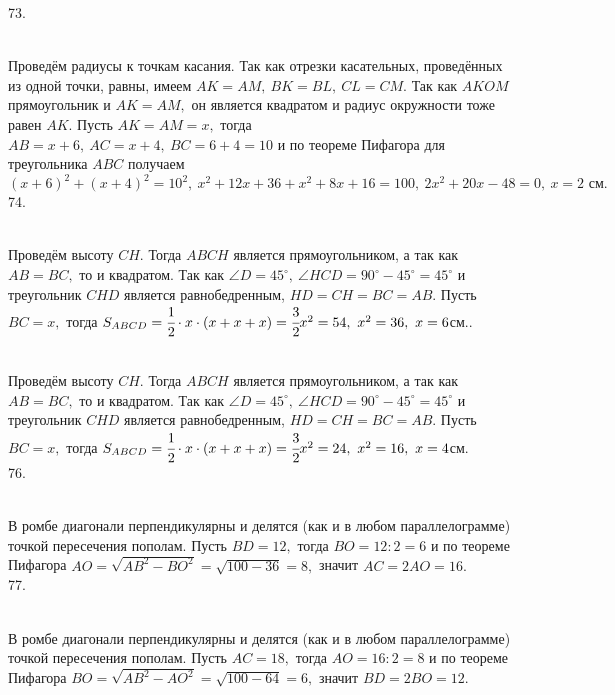 73. \begin{figure}[ht!]
\end{figure}\\
Проведём радиусы к точкам касания. Так как отрезки касательных, проведённых из одной точки, равны, имеем $AK=AM,\ BK=BL,\ CL=CM.$ Так как $AKOM$ прямоугольник и $AK=AM,$ он является квадратом и радиус окружности тоже равен $AK.$ Пусть $AK=AM=x,$ тогда $AB=x+6,\ AC=x+4,\ BC=6+4=10$ и по теореме Пифагора для треугольника $ABC$ получаем $(x+6)^2+(x+4)^2=10^2,\ x^2+12x+36+x^2+8x+16=100,\ 2x^2+20x-48=0,\ x=2\text{ см}.$\\
74. \begin{figure}[ht!]
\end{figure}\\
Проведём высоту $CH.$ Тогда $ABCH$ является прямоугольником, а так как $AB=BC,$ то и квадратом. Так как $\angle D=45^\circ,\ \angle HCD=90^\circ-45^\circ=45^\circ$ и треугольник $CHD$ является равнобедренным, $HD=CH=BC=AB.$ Пусть $BC=x,$ тогда $S_{ABCD}=\cfrac{1}{2}\cdot{x}\cdot(x+x+x)=\cfrac{3}{2}x^2=54,\ x^2=36,\ x=6$см.\newpage{}. \begin{figure}[ht!]
\end{figure}\\
Проведём высоту $CH.$ Тогда $ABCH$ является прямоугольником, а так как $AB=BC,$ то и квадратом. Так как $\angle D=45^\circ,\ \angle HCD=90^\circ-45^\circ=45^\circ$ и треугольник $CHD$ является равнобедренным, $HD=CH=BC=AB.$ Пусть $BC=x,$ тогда $S_{ABCD}=\cfrac{1}{2}\cdot{x}\cdot(x+x+x)=\cfrac{3}{2}x^2=24,\ x^2=16,\ x=4$см.\\
76. \begin{figure}[ht!]
\end{figure}\\
В ромбе диагонали перпендикулярны и делятся (как и в любом параллелограмме) точкой пересечения пополам. Пусть $BD=12,$ тогда $BO=12:2=6$ и по теореме Пифагора $AO=\sqrt{AB^2-BO^2}=\sqrt{100-36}=8,$ значит $AC=2AO=16.$\\
77. \begin{figure}[ht!]
\end{figure}\\
В ромбе диагонали перпендикулярны и делятся (как и в любом параллелограмме) точкой пересечения пополам. Пусть $AC=18,$ тогда $AO=16:2=8$ и по теореме Пифагора $BO=\sqrt{AB^2-AO^2}=\sqrt{100-64}=6,$ значит $BD=2BO=12.$\\
